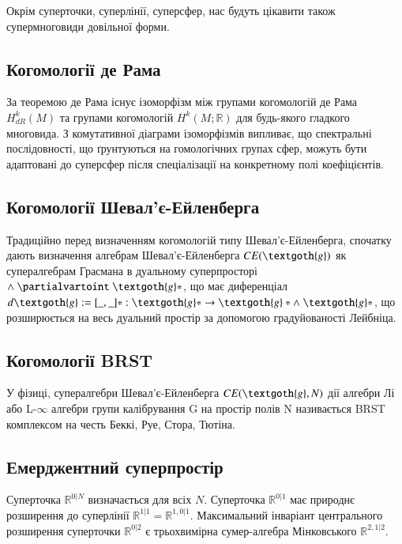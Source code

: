Окрім суперточки, суперлінії, суперсфер, нас будуть цікавити
також супермноговиди довільної форми.

\subsection*{Когомології де Рама}

За теоремою де Рама існує ізоморфізм між групами когомологій
де Рама $H_{dR}^k(M)$ та групами когомологій $H^k(M;\mathbb{R})$
для будь-якого гладкого многовида. З комутативної діаграми
ізоморфізмів випливає, що спектральні послідовності, що
ґрунтуються на гомологічних групах сфер, можуть бути
адаптовані до суперсфер після спеціалізації на конкретному полі коефіцієнтів.

\subsection*{Когомології Шевал'є-Ейленберга}

Традиційно перед визначенням когомологій типу Шевал'є-Ейленберга,
спочатку дають визначення алгебрам Шевал'є-Ейленберга $CE(\textgoth{g})$
як супералгебрам Грасмана в дуальному суперпросторі $\wedge\ \partialvartoint\ \textgoth{g}*$,
що має диференціал $d\textgoth{g} := [\_,\_]* : \textgoth{g}* \rightarrow \textgoth{g}* \wedge\ \textgoth{g}*$,
що розширюється на весь дуальний простір за допомогою
градуйованості Лейбніца.

\subsection*{Когомології BRST}

У фізиці, супералгебри Шевал'є-Ейленберга $CE(\textgoth{g}, N)$ дії алгебри
Лі або L-$\infty$ алгебри групи калібрування G на простір полів N називається
BRST комплексом на честь Беккі, Руе, Стора, Тютіна.

\newpage
\subsection*{Емерджентний суперпростір}

Суперточка $\mathbb{R}^{0|N}$ визначається для всіх $N$.
Суперточка $\mathbb{R}^{0|1}$ має природнє розширення до
суперлінії $\mathbb{R}^{1|1}=\mathbb{R}^{1,0|1}$.
Максимальний інваріант центрального розширення суперточки
$\mathbb{R}^{0|2}$ є трьохвимірна сумер-алгебра Мінковського $\mathbb{R}^{2,1|2}$.

